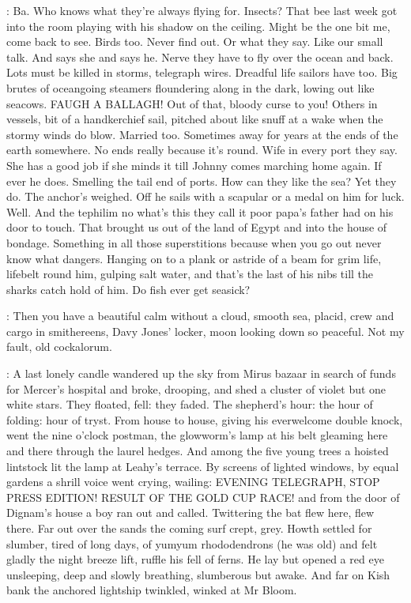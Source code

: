 \Bloom:
Ba. Who knows what they're always flying for. Insects? That bee last week
got into the room playing with his shadow on the ceiling. Might be the
one bit me, come back to see. Birds too. Never find out. Or what they say.
Like our small talk. And says she and says he. Nerve they have to fly over
the ocean and back. Lots must be killed in storms, telegraph wires.
Dreadful life sailors have too. Big brutes of oceangoing steamers
floundering along in the dark, lowing out like seacows. FAUGH A BALLAGH!
Out of that, bloody curse to you! Others in vessels, bit of a handkerchief
sail, pitched about like snuff at a wake when the stormy winds do blow.
Married too. Sometimes away for years at the ends of the earth somewhere.
No ends really because it's round. Wife in every port they say. She has a
good job if she minds it till Johnny comes marching home again. If ever he
does. Smelling the tail end of ports. How can they like the sea? Yet they
do. The anchor's weighed. Off he sails with a scapular or a medal
on him for luck. Well. And the tephilim no what's this they call it poor
papa's father had on his door to touch. That brought us out of the land
of Egypt and into the house of bondage. Something in all those
superstitions because when you go out never know what dangers. Hanging
on to a plank or astride of a beam for grim life, lifebelt round him,
gulping salt water, and that's the last of his nibs till the sharks
catch hold of him. Do fish ever get seasick?

\Bloom:
Then you have a beautiful calm without a cloud, smooth sea, placid,
crew and cargo in smithereens, Davy Jones' locker, moon looking down so
peaceful. Not my fault, old cockalorum.

:
A last lonely candle wandered up the sky from Mirus bazaar in search
of funds for Mercer's hospital and broke, drooping, and shed a cluster of
violet but one white stars. They floated, fell: they faded. The shepherd's
hour: the hour of folding: hour of tryst. From house to house, giving his
everwelcome double knock, went the nine o'clock postman, the
glowworm's lamp at his belt gleaming here and there through the laurel
hedges. And among the five young trees a hoisted lintstock lit the lamp at
Leahy's terrace. By screens of lighted windows, by equal gardens a shrill
voice went crying, wailing: EVENING TELEGRAPH, STOP PRESS EDITION! RESULT
OF THE GOLD CUP RACE! and from the door of Dignam's house a boy ran out
and called. Twittering the bat flew here, flew there. Far out over the
sands the coming surf crept, grey. Howth settled for slumber, tired of
long days, of yumyum rhododendrons (he was old) and felt gladly the night
breeze lift, ruffle his fell of ferns. He lay but opened a red eye
unsleeping, deep and slowly breathing, slumberous but awake. And far on
Kish bank the anchored lightship twinkled, winked at Mr Bloom.

